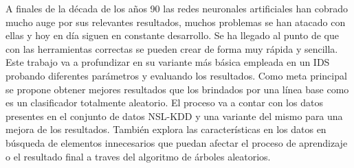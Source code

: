 A finales de la década de los años 90 las redes neuronales artificiales han cobrado mucho auge por sus relevantes resultados, muchos problemas se han atacado con ellas y hoy en día siguen en constante desarrollo. Se ha llegado al punto de que con las herramientas correctas se pueden crear de forma muy rápida y sencilla. Este trabajo va a profundizar en su variante más básica empleada en un IDS probando diferentes parámetros y evaluando los resultados. Como meta principal se propone obtener mejores resultados que los brindados por una línea base como es un clasificador totalmente aleatorio. El proceso va a contar con los datos presentes en el conjunto de datos NSL-KDD y una variante del mismo para una mejora de los resultados. También explora las características en los datos en búsqueda de elementos innecesarios que puedan afectar el proceso de aprendizaje o el resultado final a traves del algoritmo de árboles aleatorios.



